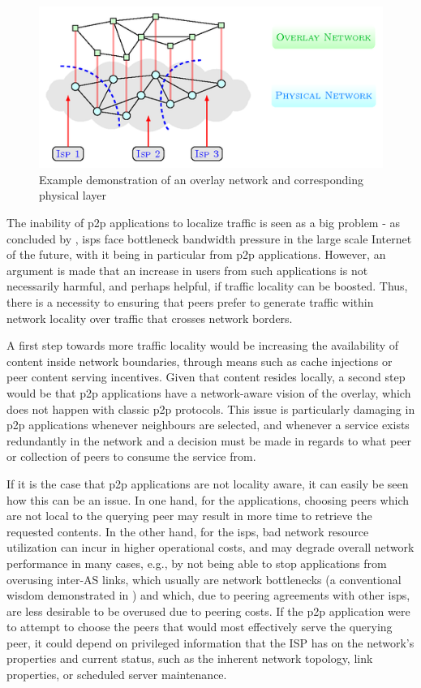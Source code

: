\begin{figure}[!h]
\centering
\includegraphics[scale=3.0]{img/p2p-topology.png}
\caption{Example demonstration of an overlay network and corresponding physical layer \cite{overlay-vs-underlay}}
\label{fig:overlay-underlay}
\end{figure}

    The inability of \gls{p2p} applications to localize traffic is seen as a big problem - as concluded by \cite{liao2014}, \glspl{isp} face bottleneck bandwidth pressure in the large scale Internet of the future, with it being in particular from \gls{p2p} applications.
    However, an argument is made that an increase in users from such applications is not necessarily harmful, and perhaps helpful, if traffic locality can be boosted.
    Thus, there is a necessity to ensuring that peers prefer to generate traffic within network locality over traffic that crosses network borders.

    A first step towards more traffic locality would be increasing the availability of content inside network boundaries, through means such as cache injections or peer content serving incentives.
    Given that content resides locally, a second step would be that \gls{p2p} applications have a network-aware vision of the overlay, which does not happen with classic \gls{p2p} protocols.
    This issue is particularly damaging in \gls{p2p} applications whenever neighbours are selected, and whenever a service exists redundantly in the network and a decision must be made in regards to what peer or collection of peers to consume the service from.

    If it is the case that \gls{p2p} applications are not locality aware, it can easily be seen how this can be an issue. In one hand, for the applications, choosing peers which are not local to the querying peer may result in more time to retrieve the requested contents. 
    In the other hand, for the \glspl{isp}, bad network resource utilization can incur in higher operational costs, and may degrade overall network performance in many cases, e.g., by not being able to stop applications from overusing inter-AS links, which usually are network bottlenecks (a conventional wisdom demonstrated in \cite{akella}) and which, due to peering agreements with other \glspl{isp}, are less desirable to be overused due to peering costs.
    If the \gls{p2p} application were to attempt to choose the peers that would most effectively serve the querying peer, it could depend on privileged information that the ISP has on the network's properties and current status, such as the inherent network topology, link properties, or scheduled server maintenance.

